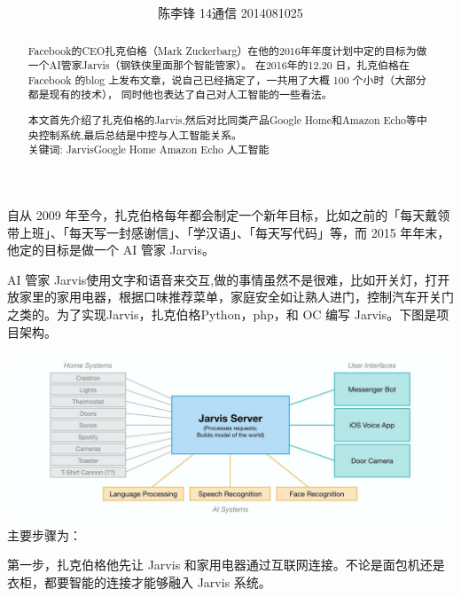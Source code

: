 \documentclass{ctexart} %
\title{\centering {\LARGE{基于互联网的创意设计}\\ \small{——扎克伯格的Jarvis}}\\%
} %
\author{\textsc \small{{陈李锋 14通信 2014081025 }} %
} %
\begin{document}
\maketitle %

\begin{abstract} %
Facebook的CEO扎克伯格（Mark Zuckerbarg）在他的2016年年度计划中定的目标为做一个AI管家Jarvis（钢铁侠里面那个智能管家）。
在2016年的12.20 日，扎克伯格在 Facebook 的blog 上发布文章，说自己已经搞定了，一共用了大概 100 个小时（大部分都是现有的技术），
同时他也表达了自己对人工智能的一些看法。

本文首先介绍了扎克伯格的Jarvis,然后对比同类产品Google Home和Amazon Echo等中央控制系统,最后总结是中控与人工智能关系。
\\关键词: Jarvis\quad  Google Home \quad Amazon Echo \quad 人工智能 

\end{abstract}

\subsubsection*{}
\paragraph{}
自从 2009 年至今，扎克伯格每年都会制定一个新年目标，比如之前的「每天戴领带上班」、「每天写一封感谢信」、「学汉语」、「每天写代码」等，而 2015 年年末，他定的目标是做一个 AI 管家 Jarvis。

AI 管家 Jarvis使用文字和语音来交互,做的事情虽然不是很难，比如开关灯，打开放家里的家用电器，根据口味推荐菜单，家庭安全如让熟人进门，控制汽车开关门之类的。为了实现Jarvis，扎克伯格Python，php，和 OC 编写 Jarvis。下图是项目架构。

\includegraphics[width=1.0\linewidth]{Jarvis_structer}
主要步骤为：

第一步，扎克伯格他先让 Jarvis 和家用电器通过互联网连接。不论是面包机还是衣柜，都要智能的连接才能够融入 Jarvis 系统。
\end{document}
